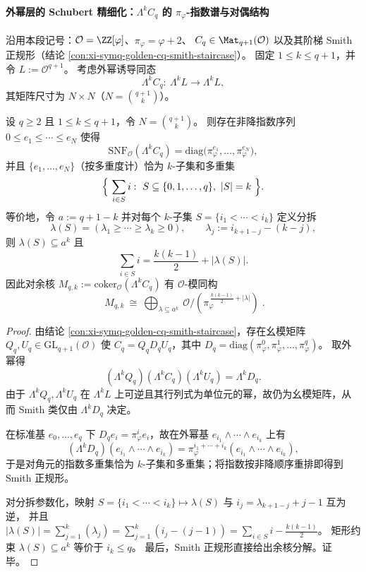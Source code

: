 \paragraph{外幂层的 Schubert 精细化：\texorpdfstring{$\Lambda^k C_q$}{Lambda^k Cq} 的 \texorpdfstring{$\pi_\varphi$}{pi}-指数谱与对偶结构}
沿用本段记号：\(\mathcal O=\ZZ[\varphi]\)、\(\pi_\varphi=\varphi+2\)、
\(
C_q\in\Mat_{q+1}(\mathcal O)
\)
以及其阶梯 Smith 正规形（结论 \ref{con:xi-symq-golden-cq-smith-staircase}）。
固定 \(1\le k\le q+1\)，并令 \(L:=\mathcal O^{q+1}\)。
考虑外幂诱导同态
\[
\Lambda^k C_q:\ \Lambda^k L\longrightarrow \Lambda^k L,
\]
其矩阵尺寸为 \(N\times N\)（\(N=\binom{q+1}{k}\)）。

\begin{theorem}\label{thm:xi-exterior-power-smith-schubert}
设 \(q\ge 2\) 且 \(1\le k\le q+1\)，令 \(N=\binom{q+1}{k}\)。
则存在非降指数序列 \(0\le e_1\le\cdots\le e_N\) 使得
\[
\mathrm{SNF}_{\mathcal O}(\Lambda^k C_q)=\mathrm{diag}\bigl(\pi_\varphi^{e_1},\dots,\pi_\varphi^{e_N}\bigr),
\]
并且 \(\{e_1,\dots,e_N\}\)（按多重度计）恰为 \(k\)-子集和多重集
\[
\Bigl\{\ \sum_{i\in S} i:\ S\subseteq\{0,1,\dots,q\},\ |S|=k\ \Bigr\}.
\]
等价地，令 \(a:=q+1-k\) 并对每个 \(k\)-子集 \(S=\{i_1<\cdots<i_k\}\) 定义分拆
\[
\lambda(S)=(\lambda_1\ge\cdots\ge \lambda_k\ge 0),
\qquad
\lambda_j:=i_{k+1-j}-(k-j),
\]
则 \(\lambda(S)\subseteq a^k\) 且
\[
\sum_{i\in S} i=\frac{k(k-1)}{2}+|\lambda(S)|.
\]
因此对余核 \(M_{q,k}:=\mathrm{coker}_{\mathcal O}(\Lambda^k C_q)\) 有 \(\mathcal O\)-模同构
\[
\boxed{\;
M_{q,k}\ \cong\ \bigoplus_{\lambda\subseteq a^k}\ \mathcal O/(\pi_\varphi^{\,\frac{k(k-1)}{2}+|\lambda|})\; }.
\]
\end{theorem}
\begin{proof}
由结论 \ref{con:xi-symq-golden-cq-smith-staircase}，存在幺模矩阵 \(Q_q,U_q\in\mathrm{GL}_{q+1}(\mathcal O)\) 使
\(
C_q=Q_qD_qU_q
\)，其中 \(D_q=\mathrm{diag}(\pi_\varphi^0,\pi_\varphi^1,\dots,\pi_\varphi^q)\)。
取外幂得
\[
(\Lambda^k Q_q)(\Lambda^k C_q)(\Lambda^k U_q)=\Lambda^k D_q.
\]
由于 \(\Lambda^k Q_q,\Lambda^k U_q\) 在 \(\Lambda^k L\) 上可逆且其行列式为单位元的幂，故仍为幺模矩阵，从而 Smith 类仅由 \(\Lambda^k D_q\) 决定。
\par
在标准基 \(e_0,\dots,e_q\) 下 \(D_qe_i=\pi_\varphi^{i}e_i\)，故在外幂基
\(
e_{i_1}\wedge\cdots\wedge e_{i_k}
\)
上有
\[
(\Lambda^k D_q)(e_{i_1}\wedge\cdots\wedge e_{i_k})
=\pi_\varphi^{i_1+\cdots+i_k}(e_{i_1}\wedge\cdots\wedge e_{i_k}),
\]
于是对角元的指数多重集恰为 \(k\)-子集和多重集；将指数按非降顺序重排即得到 Smith 正规形。
\par
对分拆参数化，映射 \(S=\{i_1<\cdots<i_k\}\mapsto\lambda(S)\) 与 \(i_j=\lambda_{k+1-j}+j-1\) 互为逆，
并且
\(
|\lambda(S)|=\sum_{j=1}^{k}(\lambda_j)=\sum_{j=1}^{k}(i_j-(j-1))=\sum_{i\in S}i-\frac{k(k-1)}{2}
\)。
矩形约束 \(\lambda(S)\subseteq a^k\) 等价于 \(i_k\le q\)。
最后，Smith 正规形直接给出余核分解。证毕。
\end{proof}

